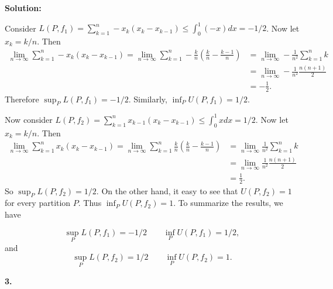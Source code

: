 \documentclass[12pt]{article}
\begin{document}
{\bf Solution:}

Consider $L(P, f_{1}) = \sum_{k=1}^{n}-x_{k}(x_{k} - x_{k-1}) \leq
\int_{0}^{1}(-x)dx = -1/2$. Now let $x_{k} = k / n$. Then 
\begin{align*} \lim_{n\rightarrow \infty}\sum_{k=1}^{n}-x_{k}(x_{k}-x_{k-1}) =
  \lim_{n\rightarrow\infty}\sum_{k=1}^{n}-\frac{k}{n}\left(\frac{k}{n}-\frac{k-1}{n}\right)
  & = \lim_{n\rightarrow\infty}-\frac{1}{n^{2}}\sum_{k=1}^{n}k \\
  & = \lim_{n\rightarrow\infty}-\frac{1}{n^{2}}\frac{n(n+1)}{2}\\
  & = -\frac{1}{2}.
\end{align*}
Therefore $\sup_{P}L(P,f_{1}) = -1/2$. Similarly, $\inf_{P}U(P, f_{1}) = 1/2$.

Now consider $L(P, f_{2}) = \sum_{k=1}^{n}x_{k-1}(x_{k} - x_{k-1}) \leq
\int_{0}^{1}xdx = 1/2$. Now let $x_{k} = k/n$. Then
\begin{align*} \lim_{n\rightarrow \infty}\sum_{k=1}^{n}x_{k}(x_{k}-x_{k-1}) =
  \lim_{n\rightarrow\infty}\sum_{k=1}^{n}\frac{k}{n}\left(\frac{k}{n}-\frac{k-1}{n}\right)
  & = \lim_{n\rightarrow\infty}\frac{1}{n^{2}}\sum_{k=1}^{n}k \\
  & = \lim_{n\rightarrow\infty}\frac{1}{n^{2}}\frac{n(n+1)}{2}\\
  & = \frac{1}{2}.
\end{align*}
So $\sup_{P}L(P, f_{2}) = 1/2$. On the other hand, it easy to see that $U(P,
f_{2}) = 1$ for every partition $P$. Thus $\inf_{P}U(P, f_{2}) = 1$. To
summarize the results, we have

\[ \sup_{P}L(P, f_{1}) = -1/2 \qquad \inf_{P}U(P, f_{1}) = 1/2, \]
and 
\[ \sup_{P}L(P, f_{2}) = 1/2 \qquad \inf_{P}U(P, f_{2}) = 1. \]

{\bf 3.} 
\end{document}

